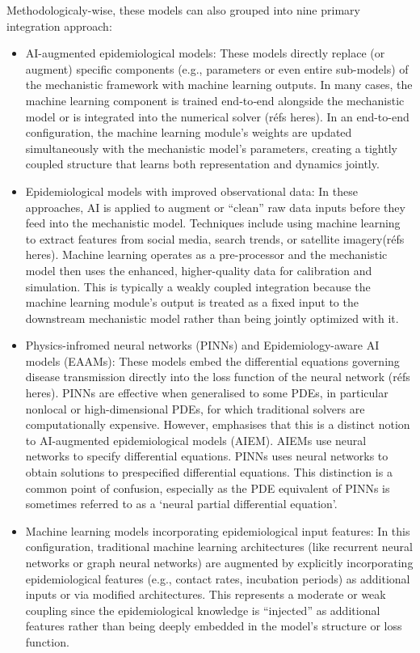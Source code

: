 Methodologicaly-wise, these models can also grouped into nine primary integration approach:
\begin{itemize}
    \item AI-augmented epidemiological models: These models directly replace (or augment) specific components (e.g., parameters or even entire sub-models) of the mechanistic framework with machine learning outputs. In many cases, the machine learning component is trained end‐to‐end alongside the mechanistic model or is integrated into the numerical solver (réfs heres). In an end-to-end configuration, the machine learning module’s weights are updated simultaneously with the mechanistic model’s parameters, creating a tightly coupled structure that learns both representation and dynamics jointly. 
    \item Epidemiological models with improved observational data: In these approaches, AI is applied to augment or “clean” raw data inputs before they feed into the mechanistic model. Techniques include using machine learning to extract features from social media, search trends, or satellite imagery(réfs heres). Machine learning operates as a pre-processor and the mechanistic model then uses the enhanced, higher-quality data for calibration and simulation. This is typically a weakly coupled integration because the machine learning module’s output is treated as a fixed input to the downstream mechanistic model rather than being jointly optimized with it.
    \item Physics-infromed neural networks (PINNs) and Epidemiology-aware AI models (EAAMs): These models embed the differential equations governing disease transmission directly into the loss function of the neural network (réfs heres). PINNs are effective when generalised to some PDEs, in particular nonlocal or high-dimensional PDEs, for which traditional solvers are computationally expensive. However, \cite{Kidger2021}  emphasises that this is a distinct notion to AI-augmented epidemiological models (AIEM). AIEMs use neural networks to specify differential equations. PINNs uses neural networks to obtain solutions to prespecified differential equations. This distinction is a common point of confusion, especially as the PDE equivalent of PINNs is sometimes referred to as a `neural partial differential equation'.
    \item Machine learning models incorporating epidemiological input features: In this configuration, traditional machine learning architectures (like recurrent neural networks or graph neural networks) are augmented by explicitly incorporating epidemiological features (e.g., contact rates, incubation periods) as additional inputs or via modified architectures. This represents a moderate or weak coupling since the epidemiological knowledge is “injected” as additional features rather than being deeply embedded in the model’s structure or loss function.

\end{itemize}
